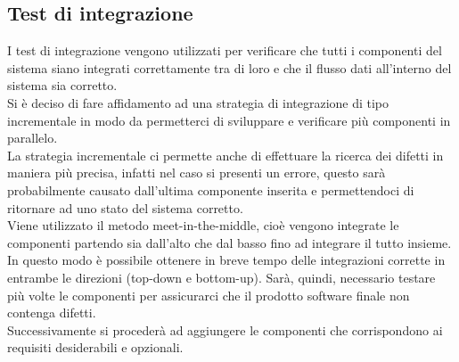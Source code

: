 	\subsection{Test di integrazione}
		I test di integrazione vengono utilizzati per verificare che tutti i componenti del sistema siano integrati correttamente tra di loro e che il flusso dati all'interno del sistema sia corretto.\\
		Si è deciso di fare affidamento ad una strategia di integrazione di tipo incrementale in modo da permetterci di sviluppare e verificare più componenti in parallelo.\\
		La strategia incrementale ci permette anche di effettuare la ricerca dei difetti in maniera più precisa, infatti nel caso si presenti un errore, questo sarà probabilmente causato dall'ultima componente inserita e permettendoci di ritornare ad uno stato del sistema corretto.\\
		Viene utilizzato il metodo meet-in-the-middle, cioè vengono integrate le componenti partendo sia dall'alto che dal basso fino ad integrare il tutto insieme. In questo modo è possibile ottenere in breve tempo delle integrazioni corrette in entrambe le direzioni (top-down e bottom-up). Sarà, quindi, necessario testare più volte le componenti per assicurarci che il prodotto software finale non contenga difetti.\\ Successivamente si procederà ad aggiungere le componenti che corrispondono ai requisiti desiderabili e opzionali.
		 
